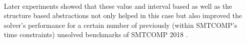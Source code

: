 \paragraph{}
Later experiments showed that these value and interval based as well as the structure based abstractions not only helped in this case but also improved the solver's performance for a certain number of previously (within SMTCOMP's time constraints) unsolved benchmarks of SMTCOMP 2018 \cite{SMTCOMP18}.